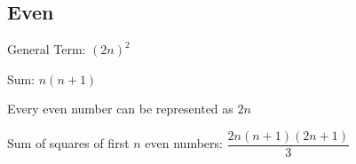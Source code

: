 \subsection{Even}

General Term: $(2n)^2$

Sum: $n(n+1)$

Every even number can be represented as $2n$

Sum of squares of first $n$ even numbers: $\dfrac{2n(n+1)(2n+1)}{3}$

